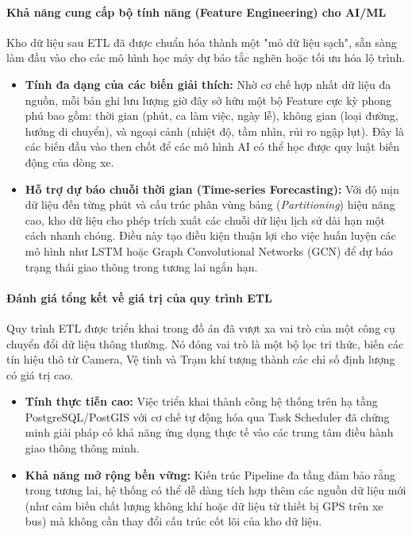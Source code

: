 \paragraph{Khả năng cung cấp bộ tính năng (Feature Engineering) cho AI/ML}
Kho dữ liệu sau ETL đã được chuẩn hóa thành một "mỏ dữ liệu sạch", sẵn sàng làm đầu vào cho các mô hình học máy dự báo tắc nghẽn hoặc tối ưu hóa lộ trình.
\begin{itemize}
    \item \textbf{Tính đa dạng của các biến giải thích:} Nhờ cơ chế hợp nhất dữ liệu đa nguồn, mỗi bản ghi lưu lượng giờ đây sở hữu một bộ Feature cực kỳ phong phú bao gồm: thời gian (phút, ca làm việc, ngày lễ), không gian (loại đường, hướng di chuyển), và ngoại cảnh (nhiệt độ, tầm nhìn, rủi ro ngập lụt). Đây là các biến đầu vào then chốt để các mô hình AI có thể học được quy luật biến động của dòng xe.
    \item \textbf{Hỗ trợ dự báo chuỗi thời gian (Time-series Forecasting):} Với độ mịn dữ liệu đến từng phút và cấu trúc phân vùng bảng (\textit{Partitioning}) hiệu năng cao, kho dữ liệu cho phép trích xuất các chuỗi dữ liệu lịch sử dài hạn một cách nhanh chóng. Điều này tạo điều kiện thuận lợi cho việc huấn luyện các mô hình như LSTM hoặc Graph Convolutional Networks (GCN) để dự báo trạng thái giao thông trong tương lai ngắn hạn.
\end{itemize}

\paragraph{ Đánh giá tổng kết về giá trị của quy trình ETL}
Quy trình ETL được triển khai trong đồ án đã vượt xa vai trò của một công cụ chuyển đổi dữ liệu thông thường. Nó đóng vai trò là một bộ lọc tri thức, biến các tín hiệu thô từ Camera, Vệ tinh và Trạm khí tượng thành các chỉ số định lượng có giá trị cao. 
\begin{itemize}
    \item \textbf{Tính thực tiễn cao:} Việc triển khai thành công hệ thống trên hạ tầng PostgreSQL/PostGIS với cơ chế tự động hóa qua Task Scheduler đã chứng minh giải pháp có khả năng ứng dụng thực tế vào các trung tâm điều hành giao thông thông minh.
    \item \textbf{Khả năng mở rộng bền vững:} Kiến trúc Pipeline đa tầng đảm bảo rằng trong tương lai, hệ thống có thể dễ dàng tích hợp thêm các nguồn dữ liệu mới (như cảm biến chất lượng không khí hoặc dữ liệu từ thiết bị GPS trên xe bus) mà không cần thay đổi cấu trúc cốt lõi của kho dữ liệu.
\end{itemize}


